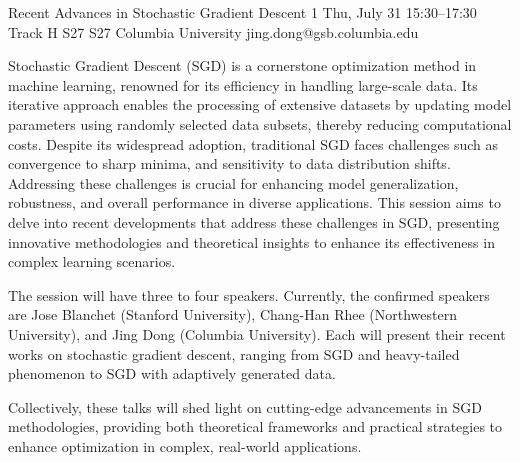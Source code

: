 \begin{talk}
  {Recent Advances in Stochastic Gradient Descent}%
  {1}%
  {}%
  {}%
  {}%
  {}%
  {Thu, July 31 15:30–17:30 Track H}%
  {S27}%
  {S27}%
  {%
    {Columbia University}%
    {jing.dong@gsb.columbia.edu}}%

Stochastic Gradient Descent (SGD) is a cornerstone optimization method in machine learning,
renowned for its efficiency in handling large-scale data. Its iterative approach enables
the processing of extensive datasets by updating model parameters using randomly selected
data subsets, thereby reducing computational costs. Despite its widespread adoption, traditional
SGD faces challenges such as convergence to sharp minima, and sensitivity to data
distribution shifts. Addressing these challenges is crucial for enhancing model generalization,
robustness, and overall performance in diverse applications. This session aims to delve into
recent developments that address these challenges in SGD, presenting innovative methodologies
and theoretical insights to enhance its effectiveness in complex learning scenarios.

The session will have three to four speakers. Currently, the confirmed speakers are Jose
Blanchet (Stanford University), Chang-Han Rhee (Northwestern University), and Jing Dong
(Columbia University). Each will present their recent works on stochastic gradient descent,
ranging from SGD and heavy-tailed phenomenon to SGD with adaptively generated data.

Collectively, these talks will shed light on cutting-edge advancements in SGD methodologies,
providing both theoretical frameworks and practical strategies to enhance optimization in
complex, real-world applications.

\end{talk}

